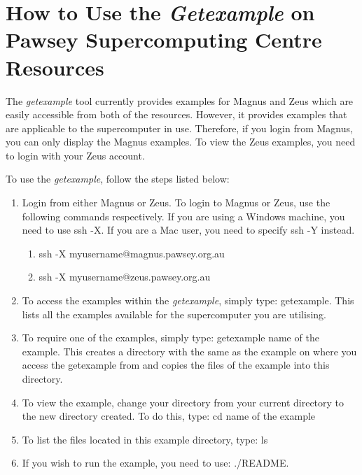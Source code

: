 \section{How to Use the \emph{Getexample} on Pawsey Supercomputing Centre Resources}

The \emph{getexample} tool currently provides examples for Magnus and Zeus which are easily accessible from both of the resources. However, it provides
examples that are applicable to the supercomputer in use. Therefore, if you login from Magnus, you can only display the Magnus examples. To view the
Zeus examples, you need to login with your Zeus account.

To use the \emph{getexample}, follow the steps listed below:

\begin{enumerate}
\item Login from either Magnus or Zeus. To login to Magnus or Zeus, use the following commands respectively. If you are using a Windows machine, you
need to use ssh -X. If you are a Mac user, you need to specify ssh -Y instead.  
\begin{enumerate}
\item ssh -X myusername@magnus.pawsey.org.au
\item ssh -X myusername@zeus.pawsey.org.au
\end{enumerate}
\item To access the examples within the \emph{getexample}, simply type: getexample. This lists all the examples available for the supercomputer you are
utilising.
\item To require one of the examples, simply type: getexample \<name of the example\>. This creates a directory with the same as the example on where you
access the getexample from and copies the files of the example into this directory.
\item To view the example, change your directory from your current directory to the new directory created. To do this, type: cd \<name of the example\>
\item To list the files located in this example directory, type: ls
\item If you wish to run the example, you need to use: ./README.
\end{enumerate}



